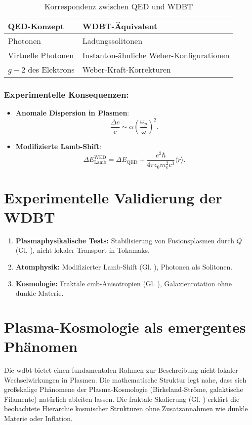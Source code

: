 \begin{table}[ht]
\centering
\begin{tabular}{ll}
\toprule
\textbf{QED-Konzept} & \textbf{WDBT-Äquivalent} \\
\midrule
Photonen & Ladungssolitonen \\
Virtuelle Photonen & Instanton-ähnliche Weber-Konfigurationen \\
$g-2$ des Elektrons & Weber-Kraft-Korrekturen \\
\bottomrule
\end{tabular}
\caption{Korrespondenz zwischen QED und WDBT}
\end{table}

\subsubsection{Experimentelle Konsequenzen:}

\begin{itemize}
    \item \textbf{Anomale Dispersion in Plasmen}:  
    \begin{equation}
    \frac{\Delta c}{c} \sim \alpha \left(\frac{\omega_p}{\omega}\right)^2.
    \end{equation}
    \item \textbf{Modifizierte Lamb-Shift}:  
    \begin{equation}
        \label{eq:lamb_shift}
        \Delta E_{\text{Lamb}}^{\text{WED}} = \Delta E_{\text{QED}} + \frac{e^2 \hbar}{4\pi \epsilon_0 m_e^2 c^3} \langle \ddot{r} \rangle.
    \end{equation}
\end{itemize}

\section{Experimentelle Validierung der WDBT}
\label{sec:experimentelle_konsequenzen}

\begin{enumerate}
    \item \textbf{Plasmaphysikalische Tests:} Stabilisierung von Fusionsplasmen durch $Q$ (Gl. ), nicht-lokaler Transport in Tokamaks.
    \item \textbf{Atomphysik:} Modifizierter Lamb-Shift (Gl. ), Photonen als Solitonen.
    \item \textbf{Kosmologie:} Fraktale \gls{cmb}-Anisotropien (Gl. ), Galaxienrotation ohne dunkle Materie.
\end{enumerate}

\section{Plasma-Kosmologie als emergentes Phänomen}
Die \gls{wdbt} bietet einen fundamentalen Rahmen zur Beschreibung nicht-lokaler Wechselwirkungen in Plasmen. Die mathematische Struktur legt nahe, dass sich großskalige Phänomene der Plasma-Kosmologie
(Birkeland-Ströme, galaktische Filamente) natürlich ableiten lassen. Die fraktale Skalierung (Gl. ) erklärt die beobachtete Hierarchie kosmischer Strukturen ohne
Zusatzannahmen wie dunkle Materie oder Inflation.
